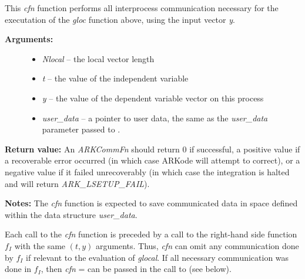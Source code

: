 \documentclass[letterpaper,10pt,english]{sphinxmanual}
\begin{document}
\begin{fulllineitems}
\label{c_interface/Preconditioners:ARKCommFn}
This \emph{cfn} function performs all interprocess
communication necessary for the executation of the \emph{gloc} function
above, using the input vector \emph{y}.
\begin{description}
\item[{\textbf{Arguments:}}] \leavevmode\begin{itemize}
\item {} 
\emph{Nlocal} -- the local vector length

\item {} 
\emph{t} -- the value of the independent variable

\item {} 
\emph{y} -- the value of the dependent variable vector on this process

\item {} 
\emph{user\_data} -- a pointer to user data, the same as the
\emph{user\_data} parameter passed to {\hyperref[c_interface/User_callable:ARKodeSetUserData]{}}.

\end{itemize}

\end{description}

\textbf{Return value:}
An \emph{ARKCommFn} should return 0 if successful, a positive value if a
recoverable error occurred (in which case ARKode will attempt to
correct), or a negative value if it failed unrecoverably (in which
case the integration is halted and {\hyperref[c_interface/User_callable:ARKode]{}} will return
\emph{ARK\_LSETUP\_FAIL}).

\textbf{Notes:}  The \emph{cfn} function is expected to save communicated data in
space defined within the data structure \emph{user\_data}.

Each call to the \emph{cfn} function is preceded by a call to the
right-hand side function $f_I$ with the same $(t,y)$
arguments. Thus, \emph{cfn} can omit any communication done by
$f_I$ if relevant to the evaluation of \emph{glocal}. If all
necessary communication was done in $f_I$, then \emph{cfn} =
 can be passed in the call to {\hyperref[c_interface/Preconditioners:ARKBBDPrecInit]{}}
(see below).

\end{fulllineitems}
\end{document}

